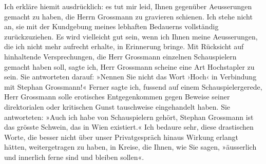 \pstart
           Ich erkläre hiemit ausdrücklich: es tut mir leid, Ihnen gegenüber Aeusserungen
               gemacht zu haben, die Herrn Grossmann zu
               gravieren schienen. Ich stehe nicht an, sie mit der Kundgebung meines lebhaften
               Bedauerns vollständig zurückzuziehen. Es wird vielleicht gut sein, wenn ich Ihnen
               meine Aeusserungen, die ich nicht mehr aufrecht erhalte, in Erinnerung bringe. Mit
               Rücksicht auf hinhaltende Versprechungen, die Herr Grossmann einzelnen {\pb}Schauspielern gemacht
               haben soll, sagte ich, Herr Grossmann scheine
               eine Art Hochstapler zu sein. Sie antworteten darauf: »Nennen Sie nicht das Wort
               ›Hoch‹ in Verbindung mit Stephan Grossmann!«
               Ferner sagte ich, fussend auf einem Schauspielergerede, Herr Grossmann solle erotisches Entgegenkommen gegen Beweise seiner
               direktorialen oder kritischen Gunst tauschweise eingehandelt haben. Sie antworteten:
               »Auch ich habe von Schauspielern gehört, Stephan Grossmann ist das grösste Schwein, das in Wien existiert.« Ich bedaure sehr, diese drastischen Worte, die besser nicht
               über unser Privatgespräch hinaus Wirkung erlangt hätten, weitergetragen zu haben, in
               Kreise, die Ihnen, wie Sie sagen, »äusserlich und innerlich ferne sind und bleiben
               sollen«.\pend
           
